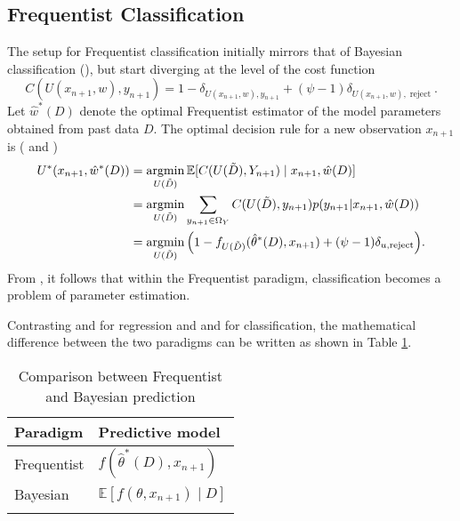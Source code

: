 \subsection{Frequentist Classification}
\label{chp:frequentist_classification}
The setup for Frequentist classification initially mirrors that of Bayesian classification (), but start diverging at the level of the cost function
\begin{equation}
	C(U(x_{n+1},w), y_{n+1}) = 1 - \delta_{U(x_{n+1},w),y_{n+1}} + (\psi-1)\delta_{U(x_{n+1},w), \operatorname{reject}}.
\end{equation}
Let $\hat{w}^*(D)$ denote the optimal Frequentist estimator of the model parameters obtained from past data $D$. The optimal decision rule for a new observation $x_{n+1}$ is ( and )
\begin{equation}
	\begin{split}
		U^*(x_{n+1}, \hat{w}^*(D)) &= \operatorname*{argmin}_{U(\tilde{D})} \mathbb{E}[C(U(\tilde{D}), Y_{n+1}) \mid x_{n+1}, \hat{w}(D)] \\
		&= \operatorname*{argmin}_{U(\tilde{D})} \sum_{y_{n+1}\in \Omega_Y}C(U(\tilde{D}),y_{n+1})p(y_{n+1}|x_{n+1}, \hat{w}(D)) \\
		&= \operatorname*{argmin}_{U(\tilde{D})} \Big(1 - f_{U(\tilde{D})}(\hat{\theta}^*(D), x_{n+1}) + (\psi-1)\delta_{u, \operatorname{reject}}\Big).
	\end{split}
	\label{freq:decision_classification}
\end{equation}
From , it follows that within the Frequentist paradigm, classification becomes a problem of parameter estimation.

\begin{remark}
	Contrasting  and  for regression and  and  for classification, the mathematical difference between the two paradigms can be written as shown in Table \ref{tab:comare}.
	\begin{table}[h!]
		\centering
		\caption{Comparison between Frequentist and Bayesian prediction}
		\begin{tabular}{ll}
			\toprule
			\textbf{Paradigm} & \textbf{Predictive model} \\
			\midrule
			Frequentist & $f(\hat{\theta}^*(D), x_{n+1})$ \\[3pt]
			Bayesian    & $\mathbb{E}[f(\theta, x_{n+1}) \mid D]$ \\[3pt]
			\bottomrule
			\label{tab:comare}
		\end{tabular}
	\end{table}
\end{remark}

